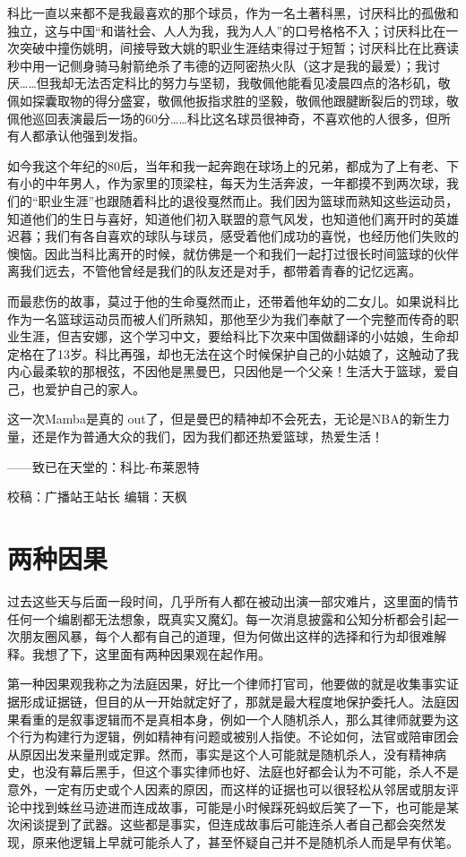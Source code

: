 \documentclass[]{book}
\begin{document}
科比一直以来都不是我最喜欢的那个球员，作为一名土著科黑，讨厌科比的孤傲和独立，这与中国``和谐社会、人人为我，我为人人''的口号格格不入；讨厌科比在一次突破中撞伤姚明，间接导致大姚的职业生涯结束得过于短暂；讨厌科比在比赛读秒中用一记侧身骑马射箭绝杀了韦德的迈阿密热火队（这才是我的最爱）；我讨厌\ldots{}\ldots{}但我却无法否定科比的努力与坚韧，我敬佩他能看见凌晨四点的洛杉矶，敬佩如探囊取物的得分盛宴，敬佩他扳指求胜的坚毅，敬佩他跟腱断裂后的罚球，敬佩他巡回表演最后一场的60分\ldots{}\ldots{}科比这名球员很神奇，不喜欢他的人很多，但所有人都承认他强到发指。

如今我这个年纪的80后，当年和我一起奔跑在球场上的兄弟，都成为了上有老、下有小的中年男人，作为家里的顶梁柱，每天为生活奔波，一年都摸不到两次球，我们的``职业生涯''也跟随着科比的退役戛然而止。我们因为篮球而熟知这些运动员，知道他们的生日与喜好，知道他们初入联盟的意气风发，也知道他们离开时的英雄迟暮；我们有各自喜欢的球队与球员，感受着他们成功的喜悦，也经历他们失败的懊恼。因此当科比离开的时候，就仿佛是一个和我们一起打过很长时间篮球的伙伴离我们远去，不管他曾经是我们的队友还是对手，都带着青春的记忆远离。

而最悲伤的故事，莫过于他的生命戛然而止，还带着他年幼的二女儿。如果说科比作为一名篮球运动员而被人们所熟知，那他至少为我们奉献了一个完整而传奇的职业生涯，但吉安娜，这个学习中文，要给科比下次来中国做翻译的小姑娘，生命却定格在了13岁。科比再强，却也无法在这个时候保护自己的小姑娘了，这触动了我内心最柔软的那根弦，不因他是黑曼巴，只因他是一个父亲！生活大于篮球，爱自己，也爱护自己的家人。

这一次Mamba是真的 out了，但是曼巴的精神却不会死去，无论是NBA的新生力量，还是作为普通大众的我们，因为我们都还热爱篮球，热爱生活！

------致已在天堂的：科比-布莱恩特

校稿：广播站王站长
编辑：天枫

\hypertarget{ux4e24ux79cdux56e0ux679c}{%
\section{两种因果}\label{ux4e24ux79cdux56e0ux679c}}

过去这些天与后面一段时间，几乎所有人都在被动出演一部灾难片，这里面的情节任何一个编剧都无法想象，既真实又魔幻。每一次消息披露和公知分析都会引起一次朋友圈风暴，每个人都有自己的道理，但为何做出这样的选择和行为却很难解释。我想了下，这里面有两种因果观在起作用。

第一种因果观我称之为法庭因果，好比一个律师打官司，他要做的就是收集事实证据形成证据链，但目的从一开始就定好了，那就是最大程度地保护委托人。法庭因果看重的是叙事逻辑而不是真相本身，例如一个人随机杀人，那么其律师就要为这个行为构建行为逻辑，例如精神有问题或被别人指使。不论如何，法官或陪审团会从原因出发来量刑或定罪。然而，事实是这个人可能就是随机杀人，没有精神病史，也没有幕后黑手，但这个事实律师也好、法庭也好都会认为不可能，杀人不是意外，一定有历史或个人因素的原因，而这样的证据也可以很轻松从邻居或朋友评论中找到蛛丝马迹进而连成故事，可能是小时候踩死蚂蚁后笑了一下，也可能是某次闲谈提到了武器。这些都是事实，但连成故事后可能连杀人者自己都会突然发现，原来他逻辑上早就可能杀人了，甚至怀疑自己并不是随机杀人而是早有伏笔。
\end{document}
